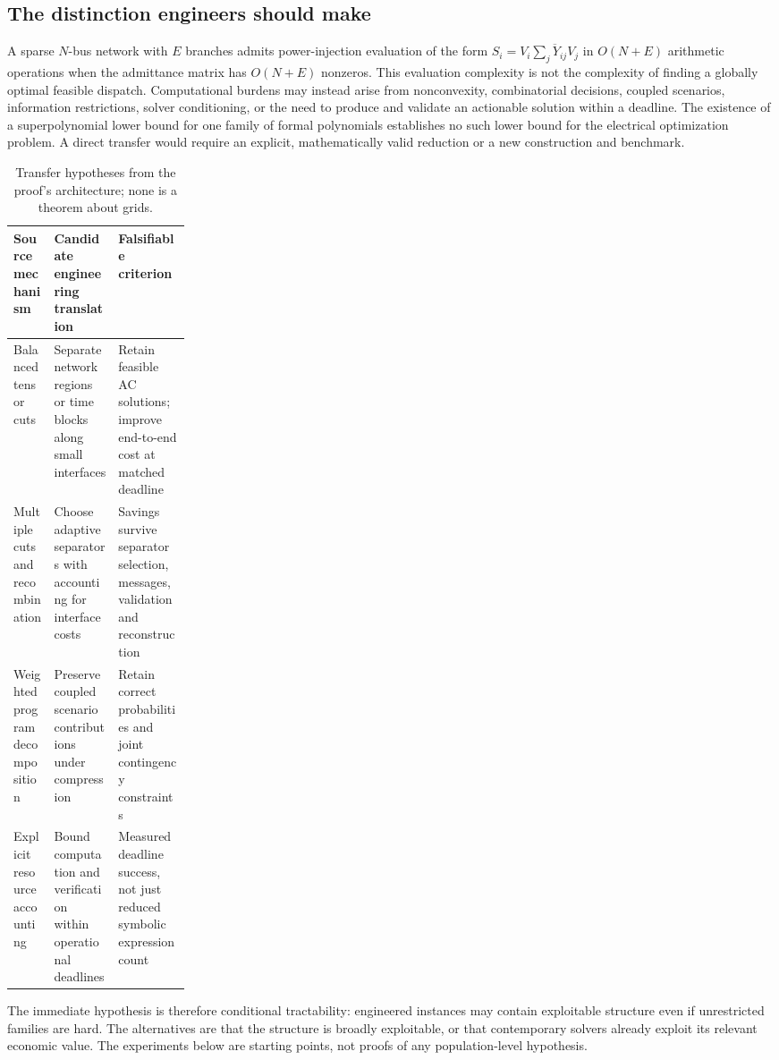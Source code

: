 \documentclass[11pt,letterpaper]{article}
\begin{document}
\subsection{The distinction engineers should make}
A sparse $N$-bus network with $E$ branches admits power-injection evaluation of the form $S_i=V_i\overline{\sum_jY_{ij}V_j}$ in $O(N+E)$ arithmetic operations when the admittance matrix has $O(N+E)$ nonzeros. This evaluation complexity is not the complexity of finding a globally optimal feasible dispatch. Computational burdens may instead arise from nonconvexity, combinatorial decisions, coupled scenarios, information restrictions, solver conditioning, or the need to produce and validate an actionable solution within a deadline. The existence of a superpolynomial lower bound for one family of formal polynomials establishes no such lower bound for the electrical optimization problem. A direct transfer would require an explicit, mathematically valid reduction or a new construction and benchmark.

\begin{table}[htbp]
\small\centering
\caption{Transfer hypotheses from the proof's architecture; none is a theorem about grids.}
\begin{tabularx}{\linewidth}{p{0.23\linewidth}YY}
\toprule
Source mechanism & Candidate engineering translation & Falsifiable criterion\\
\midrule
Balanced tensor cuts & Separate network regions or time blocks along small interfaces & Retain feasible AC solutions; improve end-to-end cost at matched deadline\\
Multiple cuts and recombination & Choose adaptive separators with accounting for interface costs & Savings survive separator selection, messages, validation and reconstruction\\
Weighted program decomposition & Preserve coupled scenario contributions under compression & Retain correct probabilities and joint contingency constraints\\
Explicit resource accounting & Bound computation and verification within operational deadlines & Measured deadline success, not just reduced symbolic expression count\\
\bottomrule
\end{tabularx}
\end{table}
The immediate hypothesis is therefore conditional tractability: engineered instances may contain exploitable structure even if unrestricted families are hard. The alternatives are that the structure is broadly exploitable, or that contemporary solvers already exploit its relevant economic value. The experiments below are starting points, not proofs of any population-level hypothesis.
\end{document}

